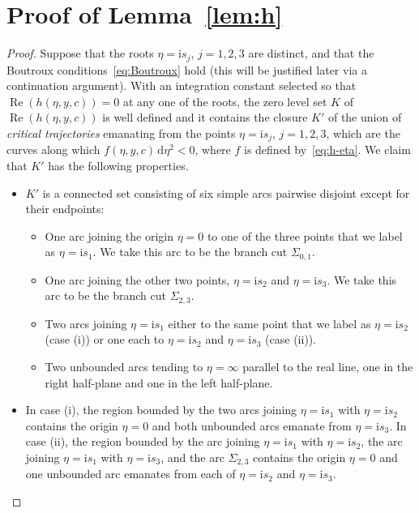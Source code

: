 \documentclass[11pt]{article}
\numberwithin{equation}{section}
\numberwithin{equation}{section}
\begin{document}
\appendix\setcounter{section}{1}
\section{Proof of Lemma~\ref{lem:h}}

\begin{proof}
Suppose that the roots $\eta=\mathrm{i} s_j$, $j=1,2,3$ are distinct, and that the Boutroux conditions~\eqref{eq:Boutroux} hold (this will be justified later via a continuation argument). With an integration constant selected so that $\operatorname{Re}(h(\eta,y,c))=0$ at any one of the roots, the zero level set $K$ of $\operatorname{Re}(h(\eta,y,c))$ is well defined and it contains the closure $K'$ of the union of \emph{critical trajectories} emanating from the points $\eta=\mathrm{i} s_j$, $j=1,2,3$, which are the curves along which $f(\eta,y,c)\,\mathrm{d}\eta^2<0$, where $f$ is defined by~\eqref{eq:h-eta}. We claim that $K'$ has the following properties.
\begin{itemize}\itemsep=0pt
\item $K'$ is a connected set consisting of six simple arcs pairwise disjoint except for their endpoints:
\begin{itemize}\itemsep=0pt
\item One arc joining the origin $\eta=0$ to one of the three points that we label as $\eta=\mathrm{i} s_1$. We take this arc to be the branch cut $\Sigma_{0,1}$.
\item One arc joining the other two points, $\eta=\mathrm{i} s_2$ and $\eta=\mathrm{i} s_3$. We take this arc to be the branch cut $\Sigma_{2,3}$.
\item Two arcs joining $\eta=\mathrm{i} s_1$ either to the same point that we label as $\eta=\mathrm{i} s_2$ (case (i)) or one each to $\eta=\mathrm{i} s_2$ and $\eta=\mathrm{i} s_3$ (case (ii)).
\item Two unbounded arcs tending to $\eta=\infty$ parallel to the real line, one in the right half-plane and one in the left half-plane.
\end{itemize}
\item In case (i), the region bounded by the two arcs joining $\eta=\mathrm{i} s_1$ with $\eta=\mathrm{i} s_2$ contains the origin $\eta=0$ and both unbounded arcs emanate from $\eta=\mathrm{i} s_3$. In case (ii), the region bounded by the arc joining $\eta=\mathrm{i} s_1$ with $\eta=\mathrm{i} s_2$, the arc joining $\eta=\mathrm{i} s_1$ with $\eta=\mathrm{i} s_3$, and the arc $\Sigma_{2,3}$ contains the origin $\eta=0$ and one unbounded arc emanates from each of $\eta=\mathrm{i} s_2$ and $\eta=\mathrm{i} s_3$.

\end{itemize}
\end{proof}
\end{document}

